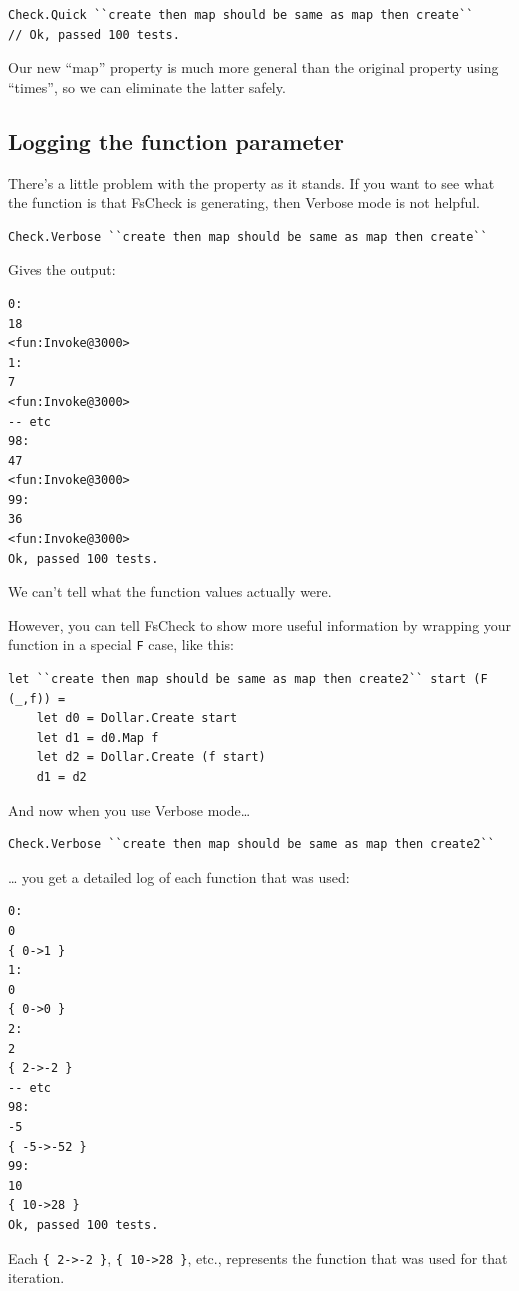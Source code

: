 \begin{verbatim}
Check.Quick ``create then map should be same as map then create`` 
// Ok, passed 100 tests.
\end{verbatim}
Our new ``map'' property is much more general than the original property
using ``times'', so we can eliminate the latter safely.

\subsection{Logging the function
parameter}\label{logging-the-function-parameter}

There's a little problem with the property as it stands. If you want to
see what the function is that FsCheck is generating, then Verbose mode
is not helpful.

\begin{verbatim}
Check.Verbose ``create then map should be same as map then create`` 
\end{verbatim}
Gives the output:

\begin{verbatim}
0:
18
<fun:Invoke@3000>
1:
7
<fun:Invoke@3000>
-- etc
98:
47
<fun:Invoke@3000>
99:
36
<fun:Invoke@3000>
Ok, passed 100 tests.
\end{verbatim}

We can't tell what the function values actually were.

However, you can tell FsCheck to show more useful information by
wrapping your function in a special \texttt{F} case, like this:

\begin{verbatim}
let ``create then map should be same as map then create2`` start (F (_,f)) = 
	let d0 = Dollar.Create start
	let d1 = d0.Map f  
	let d2 = Dollar.Create (f start)     
	d1 = d2
\end{verbatim}
And now when you use Verbose mode\ldots{}

\begin{verbatim}
Check.Verbose ``create then map should be same as map then create2`` 
\end{verbatim}
\ldots{} you get a detailed log of each function that was used:

\begin{verbatim}
0:
0
{ 0->1 }
1:
0
{ 0->0 }
2:
2
{ 2->-2 }
-- etc
98:
-5
{ -5->-52 }
99:
10
{ 10->28 }
Ok, passed 100 tests.
\end{verbatim}

Each \texttt{\{\ 2-\textgreater{}-2\ \}},
\texttt{\{\ 10-\textgreater{}28\ \}}, etc., represents the function that
was used for that iteration.



